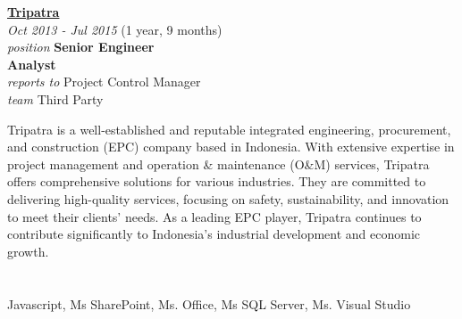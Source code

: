 \documentclass[12pt]{res} %
\begin{document}
\begin{resume}
\vspace{16pt} %
\begin{minipage}[t]{6.5cm}
\begin{flushleft}
	{\large {\bf \href{https://tripatra.com}{Tripatra}}} \\
	{\footnotesize{\sl Oct 2013 - Jul 2015} \hfill (1 year, 9 months)}\\
	{\footnotesize{\sl position} \hfill \bf{Senior Engineer\\ \hfill Analyst}}\\
	{\footnotesize{\sl reports to} \hfill Project Control Manager}\\
	{\footnotesize{\sl team} \hfill Third Party}\\
\end{flushleft}
\end{minipage}
\hspace{0.5cm}
\begin{minipage}[t]{0.56\linewidth}
	Tripatra is a well-established and reputable integrated engineering, procurement, and construction (EPC) company based in Indonesia. With extensive expertise in project management and operation \& maintenance (O\&M) services, Tripatra offers comprehensive solutions for various industries. They are committed to delivering high-quality services, focusing on safety, sustainability, and innovation to meet their clients' needs. As a leading EPC player, Tripatra continues to contribute significantly to Indonesia's industrial development and economic growth.
\end{minipage}

	\section{}
	\vspace{-10pt}
	\begin{flushleft}
		Javascript, Ms SharePoint, Ms. Office, Ms SQL Server, Ms. Visual Studio
	\end{flushleft}


\end{resume}
\end{document}
